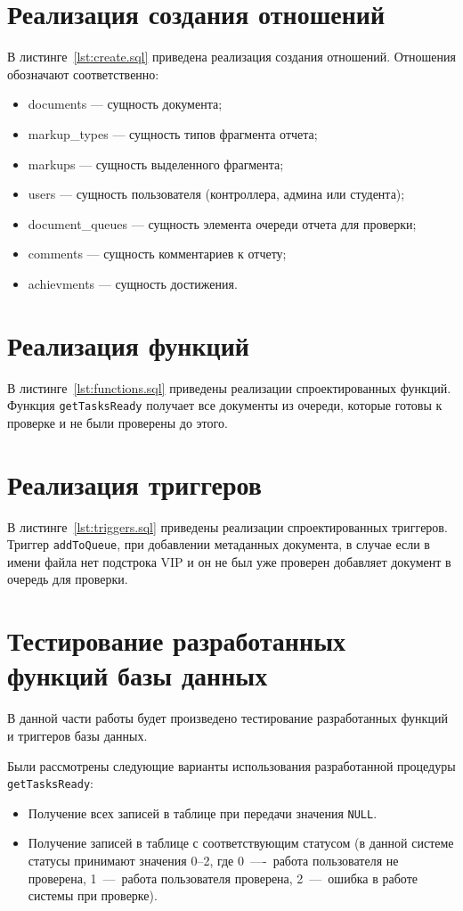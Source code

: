 \section{Реализация создания отношений}
В листинге~\ref{lst:create.sql} приведена реализация создания отношений.
Отношения обозначают соответственно:
\begin{itemize}
	\item documents --- сущность документа;
	\item markup\_types --- сущность типов фрагмента отчета;
	\item markups --- сущность выделенного фрагмента;
	\item users --- сущность пользователя (контроллера, админа или студента);
	\item document\_queues --- сущность элемента очереди отчета для проверки;
	\item comments --- сущность комментариев к отчету;
	\item achievments --- сущность достижения.
\end{itemize}


\section{Реализация функций}
В листинге~\ref{lst:functions.sql} приведены реализации спроектированных
функций. Функция \texttt{getTasksReady} получает все документы из очереди,
которые готовы к проверке и не были проверены до этого.

\section{Реализация триггеров}
В листинге~\ref{lst:triggers.sql} приведены реализации спроектированных
триггеров. Триггер \texttt{addToQueue}, при добавлении метаданных документа, в
случае если в имени файла нет подстрока VIP и он не был уже проверен добавляет
документ в очередь для проверки.

\section{Тестирование разработанных функций базы данных}
В данной части работы будет произведено тестирование разработанных функций и
триггеров базы данных.

Были рассмотрены следующие варианты использования разработанной процедуры
\texttt{getTasksReady}:
\begin{itemize}
	\item Получение всех записей в таблице при передачи значения \texttt{NULL}.
	\item Получение записей в таблице с соответствующим статусом (в данной системе
	статусы принимают значения 0--2, где 0~----~работа пользователя не проверена,
	1~---~работа пользователя проверена, 2~---~ошибка в работе системы при
	проверке).
\end{itemize}

